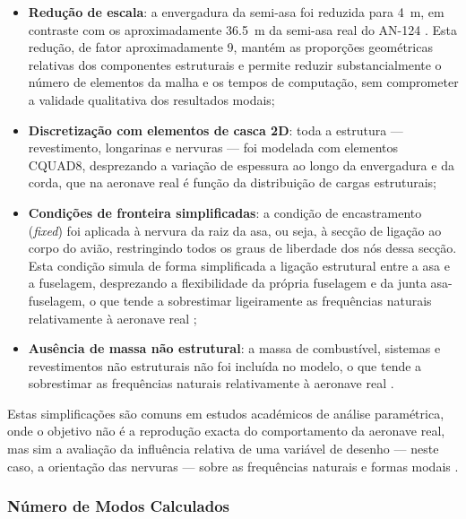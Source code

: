 \documentclass[a4paper,fleqn,noprintline]{cas-dc}
\begin{document}
\begin{itemize}
    \item \textbf{Redução de escala}: a envergadura da semi-asa foi reduzida para \SI{4}{\meter}, em contraste com os aproximadamente \SI{36.5}{\meter} da semi-asa real do AN-124 \cite{Antonov2004}. Esta redução, de fator aproximadamente 9, mantém as proporções geométricas relativas dos componentes estruturais e permite reduzir substancialmente o número de elementos da malha e os tempos de computação, sem comprometer a validade qualitativa dos resultados modais;

    \item \textbf{Discretização com elementos de casca 2D}: toda a estrutura --- revestimento, longarinas e nervuras --- foi modelada com elementos CQUAD8, desprezando a variação de espessura ao longo da envergadura e da corda, que na aeronave real é função da distribuição de cargas estruturais;

    \item \textbf{Condições de fronteira simplificadas}: a condição de encastramento (\textit{fixed}) foi aplicada à nervura da raiz da asa, ou seja, à secção de ligação ao corpo do avião, restringindo todos os graus de liberdade dos nós dessa secção. Esta condição simula de forma simplificada a ligação estrutural entre a asa e a fuselagem, desprezando a flexibilidade da própria fuselagem e da junta asa-fuselagem, o que tende a sobrestimar ligeiramente as frequências naturais relativamente à aeronave real \cite{Wright2015, Hodges2011};

    \item \textbf{Ausência de massa não estrutural}: a massa de combustível, sistemas e revestimentos não estruturais não foi incluída no modelo, o que tende a sobrestimar as frequências naturais relativamente à aeronave real \cite{Wright2015}.
\end{itemize}

Estas simplificações são comuns em estudos académicos de análise paramétrica, onde o objetivo não é a reprodução exacta do comportamento da aeronave real, mas sim a avaliação da influência relativa de uma variável de desenho --- neste caso, a orientação das nervuras --- sobre as frequências naturais e formas modais \cite{Dowell2004}.

\subsubsection{Número de Modos Calculados}
\end{document}
